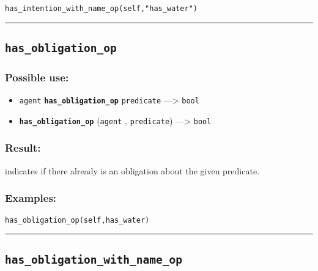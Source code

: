 \documentclass[]{book}
\providecommand{\tightlist}{%
  \setlength{\itemsep}{0pt}\setlength{\parskip}{0pt}}
\theoremstyle{definition}
\theoremstyle{definition}
\theoremstyle{definition}
\theoremstyle{remark}
\begin{document}
\begin{verbatim}
has_intention_with_name_op(self,"has_water") 
\end{verbatim}

\begin{center}\rule{0.5\linewidth}{\linethickness}\end{center}

\subsection{\texorpdfstring{\texttt{has\_obligation\_op}}{has\_obligation\_op}}\label{has_obligation_op}

\subsubsection{Possible use:}\label{possible-use-254}

\begin{itemize}
\tightlist
\item
  \texttt{agent} \textbf{\texttt{has\_obligation\_op}}
  \texttt{predicate} ---\textgreater{} \texttt{bool}
\item
  \textbf{\texttt{has\_obligation\_op}} (\texttt{agent} ,
  \texttt{predicate}) ---\textgreater{} \texttt{bool}
\end{itemize}

\subsubsection{Result:}\label{result-245}

indicates if there already is an obligation about the given predicate.

\subsubsection{Examples:}\label{examples-194}

\begin{verbatim}
has_obligation_op(self,has_water) 
\end{verbatim}

\begin{center}\rule{0.5\linewidth}{\linethickness}\end{center}

\subsection{\texorpdfstring{\texttt{has\_obligation\_with\_name\_op}}{has\_obligation\_with\_name\_op}}\label{has_obligation_with_name_op}
\end{document}
